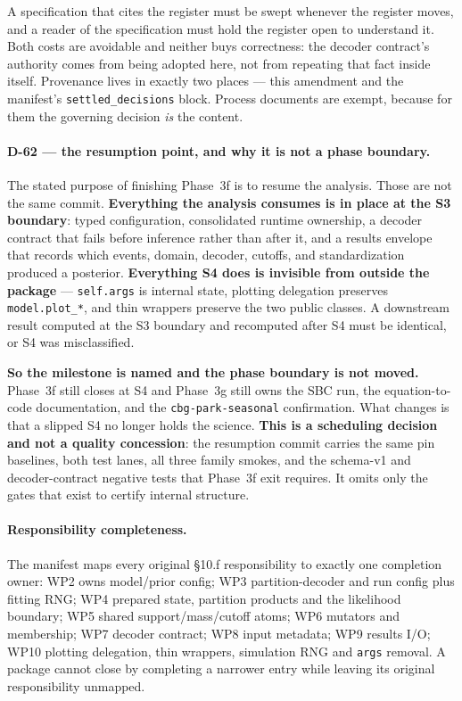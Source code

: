 \documentclass[
  10pt,
]{article}
\begin{document}
A specification that cites the register must be swept whenever the register
moves, and a reader of the specification must hold the register open to
understand it. Both costs are avoidable and neither buys correctness: the
decoder contract's authority comes from being adopted here, not from repeating
that fact inside itself. Provenance lives in exactly two places --- this
amendment and the manifest's \texttt{settled\_decisions} block. Process
documents are exempt, because for them the governing decision \emph{is} the
content.

\paragraph{D-62 --- the resumption point, and why it is not a phase boundary.}

The stated purpose of finishing Phase~3f is to resume the analysis. Those are
not the same commit. \textbf{Everything the analysis consumes is in place at
the S3 boundary}: typed configuration, consolidated runtime ownership, a
decoder contract that fails before inference rather than after it, and a
results envelope that records which events, domain, decoder, cutoffs, and
standardization produced a posterior. \textbf{Everything S4 does is invisible
from outside the package} --- \texttt{self.args} is internal state, plotting
delegation preserves \texttt{model.plot\_*}, and thin wrappers preserve the two
public classes. A downstream result computed at the S3 boundary and recomputed
after S4 must be identical, or S4 was misclassified.

\textbf{So the milestone is named and the phase boundary is not moved.} Phase~3f
still closes at S4 and Phase~3g still owns the SBC run, the equation-to-code
documentation, and the \texttt{cbg-park-seasonal} confirmation. What changes is
that a slipped S4 no longer holds the science. \textbf{This is a scheduling
decision and not a quality concession}: the resumption commit carries the same
pin baselines, both test lanes, all three family smokes, and the schema-v1 and
decoder-contract negative tests that Phase~3f exit requires. It omits only the
gates that exist to certify internal structure.

\paragraph{Responsibility completeness.}

The manifest maps every original \S10.f responsibility to exactly one
completion owner: WP2 owns model/prior config; WP3 partition-decoder and run
config plus fitting RNG; WP4 prepared state, partition products and the
likelihood boundary; WP5 shared support/mass/cutoff atoms; WP6 mutators and
membership; WP7 decoder contract; WP8 input metadata; WP9 results I/O; WP10
plotting delegation, thin wrappers, simulation RNG and \texttt{args} removal.
A package cannot close by completing a narrower entry while leaving its
original responsibility unmapped.
\end{document}
